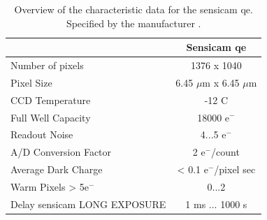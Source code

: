 \begin{table}[h]
	\centering
	\caption{Overview of the characteristic data for the sensicam qe. Specified by the manufacturer \cite{ManualSensicam}.}
	\label{table:CCDcamera}
	\begin{tabular}{l c}
		\hline
		\rowcolor{lightgray}
		& \textbf{Sensicam qe} \\ \hline
		Number of pixels & 1376 x 1040 \\
		Pixel Size & 6.45 $\mu$m x 6.45 $\mu$m \\
		CCD Temperature & -12 \textdegree C \\
		Full Well Capacity & 18000 e$^-$ \\
		Readout Noise & 4...5 e$^-$ \\
		A/D Conversion Factor & 2 e$^-$/count \\
		Average Dark Charge & < 0.1 e$^-$/pixel sec \\
		Warm Pixels > 5e$^-$ & 0...2 \\
		Delay sensicam LONG EXPOSURE & 1 ms ... 1000 s \\ \hline
	\end{tabular}
\end{table}